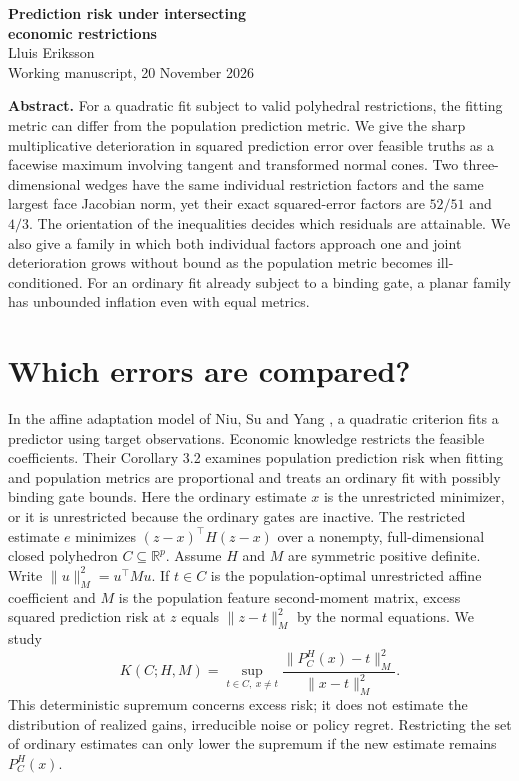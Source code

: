 \documentclass[11pt]{article}
\newcommand{\R}{\mathbb R}
\begin{document}
\begin{center}{\LARGE\bfseries Prediction risk under intersecting\\[3pt] economic restrictions}\\[8pt]
Lluis Eriksson\\[2pt]\small Working manuscript, 20 November 2026\end{center}
\textbf{Abstract.} For a quadratic fit subject to valid polyhedral restrictions, the fitting metric can differ from the population prediction metric. We give the sharp multiplicative deterioration in squared prediction error over feasible truths as a facewise maximum involving tangent and transformed normal cones. Two three-dimensional wedges have the same individual restriction factors and the same largest face Jacobian norm, yet their exact squared-error factors are $52/51$ and $4/3$. The orientation of the inequalities decides which residuals are attainable. We also give a family in which both individual factors approach one and joint deterioration grows without bound as the population metric becomes ill-conditioned. For an ordinary fit already subject to a binding gate, a planar family has unbounded inflation even with equal metrics.

\section{Which errors are compared?}
In the affine adaptation model of Niu, Su and Yang \cite{niu}, a quadratic criterion fits a predictor using target observations. Economic knowledge restricts the feasible coefficients. Their Corollary 3.2 examines population prediction risk when fitting and population metrics are proportional and treats an ordinary fit with possibly binding gate bounds. Here the ordinary estimate $x$ is the unrestricted minimizer, or it is unrestricted because the ordinary gates are inactive. The restricted estimate $e$ minimizes $(z-x)^\top H(z-x)$ over a nonempty, full-dimensional closed polyhedron $C\subseteq\R^p$. Assume $H$ and $M$ are symmetric positive definite. Write $\|u\|_M^2=u^\top M u$. If $t\in C$ is the population-optimal unrestricted affine coefficient and $M$ is the population feature second-moment matrix, excess squared prediction risk at $z$ equals $\|z-t\|_M^2$ by the normal equations. We study
\[
 K(C;H,M)=\sup_{t\in C,\ x\ne t}
 \frac{\|P_C^H(x)-t\|_M^2}{\|x-t\|_M^2}.
\]
This deterministic supremum concerns excess risk; it does not estimate the distribution of realized gains, irreducible noise or policy regret. Restricting the set of ordinary estimates can only lower the supremum if the new estimate remains $P_C^H(x)$.
\end{document}
